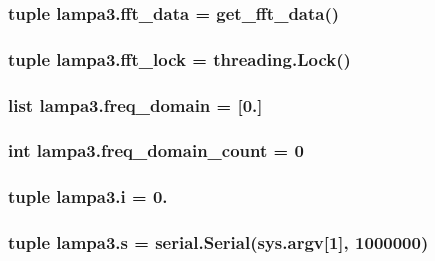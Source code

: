 \subsubsection[{fft\+\_\+data}]{\setlength{\rightskip}{0pt plus 5cm}tuple lampa3.\+fft\+\_\+data = {\bf get\+\_\+fft\+\_\+data}()}\label{namespacelampa3_a3500d825a57d4f8db0ec5e03a08602d9}
\hypertarget{namespacelampa3_a80026bcfb224cd94af6d8ad60301e398}{}
\subsubsection[{fft\+\_\+lock}]{\setlength{\rightskip}{0pt plus 5cm}tuple lampa3.\+fft\+\_\+lock = threading.\+Lock()}\label{namespacelampa3_a80026bcfb224cd94af6d8ad60301e398}
\hypertarget{namespacelampa3_aa47843cd430959c4ddc3a47b9227284f}{}
\subsubsection[{freq\+\_\+domain}]{\setlength{\rightskip}{0pt plus 5cm}list lampa3.\+freq\+\_\+domain = \mbox{[}0.\mbox{]}}\label{namespacelampa3_aa47843cd430959c4ddc3a47b9227284f}
\hypertarget{namespacelampa3_ace298728f04f3d541eff23150215fb9d}{}
\subsubsection[{freq\+\_\+domain\+\_\+count}]{\setlength{\rightskip}{0pt plus 5cm}int lampa3.\+freq\+\_\+domain\+\_\+count = 0}\label{namespacelampa3_ace298728f04f3d541eff23150215fb9d}
\hypertarget{namespacelampa3_a18c385fc065e4af2e9dd2ae741f22cc8}{}
\subsubsection[{i}]{\setlength{\rightskip}{0pt plus 5cm}tuple lampa3.\+i = 0.}\label{namespacelampa3_a18c385fc065e4af2e9dd2ae741f22cc8}
\hypertarget{namespacelampa3_a9fdf34c088d41a24177acb920b2fd18e}{}
\subsubsection[{s}]{\setlength{\rightskip}{0pt plus 5cm}tuple lampa3.\+s = serial.\+Serial(sys.\+argv\mbox{[}1\mbox{]}, 1000000)}\label{namespacelampa3_a9fdf34c088d41a24177acb920b2fd18e}
